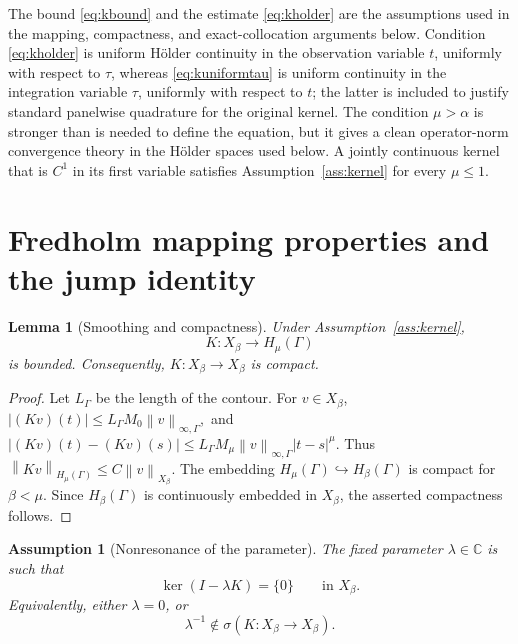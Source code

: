 \documentclass[11pt,a4paper]{amsart}
\theoremstyle{plain}
\newtheorem{lemma}[theorem]{Lemma}
\newtheorem{assumption}[theorem]{Assumption}
\theoremstyle{definition}
\theoremstyle{remark}
\newcommand{\Ga}{\Gamma}
\newcommand{\C}{\mathbb C}
\newcommand{\norm}[1]{\left\|#1\right\|}
\begin{document}
The bound \eqref{eq:kbound} and the estimate \eqref{eq:kholder} are the assumptions used in the mapping, compactness, and exact-collocation arguments below.  Condition \eqref{eq:kholder} is uniform H\"older continuity in the observation variable $t$, uniformly with respect to $\tau$, whereas \eqref{eq:kuniformtau} is uniform continuity in the integration variable $\tau$, uniformly with respect to $t$; the latter is included to justify standard panelwise quadrature for the original kernel.  The condition $\mu>\alpha$ is stronger than is needed to define the equation, but it gives a clean operator-norm convergence theory in the H\"older spaces used below.  A jointly continuous kernel that is $C^1$ in its first variable satisfies Assumption~\ref{ass:kernel} for every $\mu\le1$.

\section{Fredholm mapping properties and the jump identity}\label{sec:operator}

\begin{lemma}[Smoothing and compactness]\label{lem:Kmapping}
Under Assumption~\ref{ass:kernel},
\[
        K:X_\beta\longrightarrow H_\mu(\Ga)
\]
is bounded.  Consequently, $K:X_\beta\to X_\beta$ is compact.
\end{lemma}

\begin{proof}
Let $L_\Ga$ be the length of the contour.  For $v\in X_\beta$,
$
        |(Kv)(t)|
        \le L_\Ga M_0\norm{v}_{\infty,\Ga},
$
and
$
        |(Kv)(t)-(Kv)(s)|
        \le L_\Ga M_\mu\norm{v}_{\infty,\Ga}|t-s|^\mu.
$
Thus
$
        \norm{Kv}_{H_\mu(\Ga)}
        \le C\norm{v}_{X_\beta}.
$
The embedding $H_\mu(\Ga)\hookrightarrow H_\beta(\Ga)$ is compact for $\beta<\mu$.  Since $H_\beta(\Ga)$ is continuously embedded in $X_\beta$, the asserted compactness follows.
\end{proof}

\begin{assumption}[Nonresonance of the parameter]\label{ass:injectivity}
The fixed parameter $\lambda\in\C$ is such that
\begin{equation}\label{eq:nonresonance}
        \ker(I-\lambda K)=\{0\}
        \qquad\text{in }X_\beta.
\end{equation}
Equivalently, either $\lambda=0$, or
\[
        \lambda^{-1}\notin\sigma(K:X_\beta\to X_\beta).
\]
\end{assumption}
\end{document}
